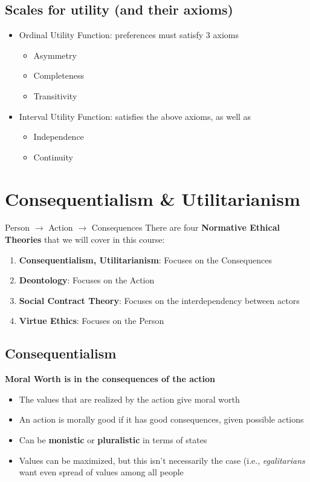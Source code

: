 \documentclass{article}
\begin{document}
    \subsection{Scales for utility (and their axioms)}
    \begin{itemize}
        \item Ordinal Utility Function: preferences must satisfy 3 axioms
        \begin{itemize}
            \item Asymmetry
            \item Completeness
            \item Transitivity
        \end{itemize}
        \item Interval Utility Function: satisfies the above axioms, as well as
        \begin{itemize}
            \item Independence
            \item Continuity
        \end{itemize}{}
    \end{itemize}{}


\section{Consequentialism \& Utilitarianism}
Person $\longrightarrow$ Action $\longrightarrow$ Consequences
\bigbreak There are four \textbf{Normative Ethical Theories} that we will cover in this course:
\begin{enumerate}
    \item \textbf{Consequentialism, Utilitarianism}: Focuses on the Consequences
    \item \textbf{Deontology}: Focuses on the Action
    \item \textbf{Social Contract Theory}: Focuses on the interdependency between actors
    \item \textbf{Virtue Ethics}: Focuses on the Person
\end{enumerate}{}

    \subsection{Consequentialism}
    \textbf{Moral Worth is in the consequences of the action}
    \begin{itemize}
        \item The values that are realized by the action give moral worth
        \item An action is morally good if it has good consequences, given possible actions %
        \item Can be \textbf{monistic} or \textbf{pluralistic} in terms of states
        \item Values can be maximized, but this isn't necessarily the case (i.e., \textit{egalitarians} want even spread of values among all people
    \end{itemize}
\end{document}
